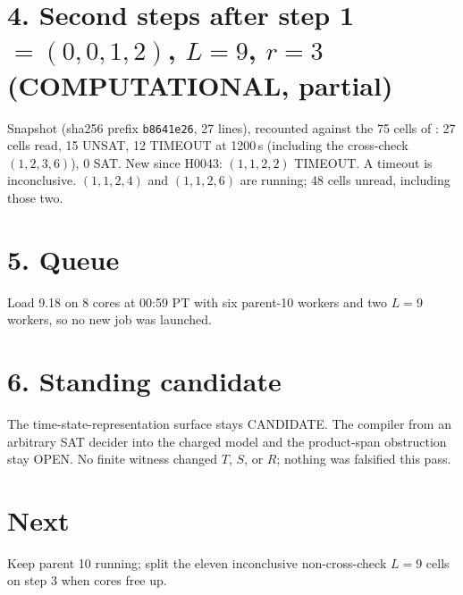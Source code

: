 \documentclass[11pt]{article}
\begin{document}
\section*{4. Second steps after step 1 $=(0,0,1,2)$, $L=9$, $r=3$ (COMPUTATIONAL, partial)}
Snapshot  (sha256 prefix \texttt{b8641e26}, 27 lines), recounted against the 75 cells of : 27 cells read, 15 UNSAT, 12 TIMEOUT at 1200\,s (including the cross-check $(1,2,3,6)$), 0 SAT. New since H0043: $(1,1,2,2)$ TIMEOUT. A timeout is inconclusive. $(1,1,2,4)$ and $(1,1,2,6)$ are running; 48 cells unread, including those two.

\section*{5. Queue}
Load 9.18 on 8 cores at 00:59 PT with six parent-10 workers and two $L=9$ workers, so no new job was launched.

\section*{6. Standing candidate}
The time-state-representation surface stays CANDIDATE. The compiler from an arbitrary SAT decider into the charged model and the product-span obstruction stay OPEN. No finite witness changed $T$, $S$, or $R$; nothing was falsified this pass.

\section*{Next}
Keep parent 10 running; split the eleven inconclusive non-cross-check $L=9$ cells on step 3 when cores free up.
\end{document}

